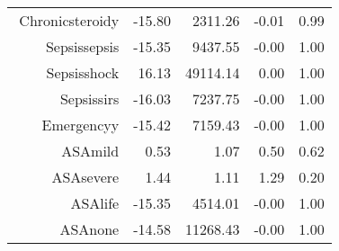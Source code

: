 \begin{tabular}{rrrrr}
$$  Chronic\-steroid\-y & -15.80 & 2311.26 & -0.01 & 0.99 \\ 
  Sepsis\-sepsis & -15.35 & 9437.55 & -0.00 & 1.00 \\ 
  Sepsis\-shock & 16.13 & 49114.14 & 0.00 & 1.00 \\ 
  Sepsis\-sirs & -16.03 & 7237.75 & -0.00 & 1.00 \\ 
  Emergency\-y & -15.42 & 7159.43 & -0.00 & 1.00 \\ 
  ASA\-mild & 0.53 & 1.07 & 0.50 & 0.62 \\ 
  ASA\-severe & 1.44 & 1.11 & 1.29 & 0.20 \\ 
  ASA\-life & -15.35 & 4514.01 & -0.00 & 1.00 \\ 
  ASA\-none & -14.58 & 11268.43 & -0.00 & 1.00 \\ 
   \hline
\end{tabular}

